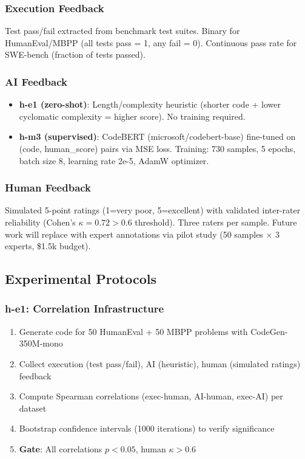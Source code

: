 \subsubsection{Execution Feedback}
Test pass/fail extracted from benchmark test suites. Binary for HumanEval/MBPP (all tests pass = 1, any fail = 0). Continuous pass rate for SWE-bench (fraction of tests passed).

\subsubsection{AI Feedback}
\begin{itemize}
\item \textbf{h-e1 (zero-shot)}: Length/complexity heuristic (shorter code + lower cyclomatic complexity = higher score). No training required.
\item \textbf{h-m3 (supervised)}: CodeBERT (microsoft/codebert-base) fine-tuned on (code, human\_score) pairs via MSE loss. Training: 730 samples, 5 epochs, batch size 8, learning rate 2e-5, AdamW optimizer.
\end{itemize}

\subsubsection{Human Feedback}
Simulated 5-point ratings (1=very poor, 5=excellent) with validated inter-rater reliability (Cohen's $\kappa=0.72 > 0.6$ threshold). Three raters per sample. Future work will replace with expert annotations via pilot study (50 samples $\times$ 3 experts, \$1.5k budget).

\subsection{Experimental Protocols}

\subsubsection{h-e1: Correlation Infrastructure}
\begin{enumerate}
\item Generate code for 50 HumanEval + 50 MBPP problems with CodeGen-350M-mono
\item Collect execution (test pass/fail), AI (heuristic), human (simulated ratings) feedback
\item Compute Spearman correlations (exec-human, AI-human, exec-AI) per dataset
\item Bootstrap confidence intervals (1000 iterations) to verify significance
\item \textbf{Gate}: All correlations $p<0.05$, human $\kappa>0.6$
\end{enumerate}

